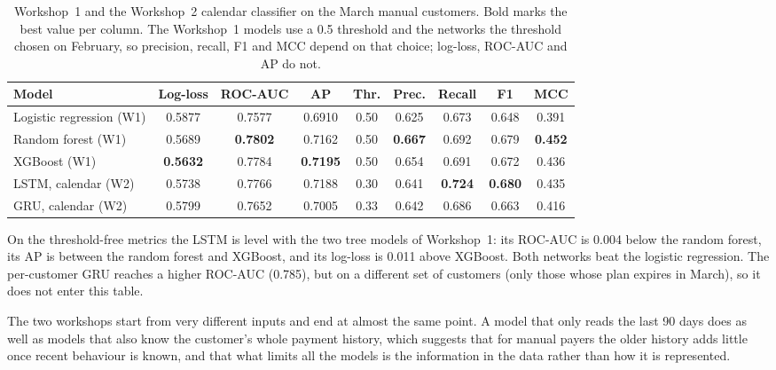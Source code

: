 \documentclass{article}
\begin{document}
\begin{table}[H]
\centering
\small
\setlength{\tabcolsep}{4pt}
\renewcommand{\arraystretch}{1.25}
\begin{tabular}{|l|c|c|c|c|c|c|c|c|}
\hline
\textbf{Model} & \textbf{Log-loss} & \textbf{ROC-AUC} & \textbf{AP} & \textbf{Thr.} & \textbf{Prec.} & \textbf{Recall} & \textbf{F1} & \textbf{MCC} \\ \hline
Logistic regression (W1) & 0.5877 & 0.7577 & 0.6910 & 0.50 & 0.625 & 0.673 & 0.648 & 0.391 \\ \hline
Random forest (W1)       & 0.5689 & \textbf{0.7802} & 0.7162 & 0.50 & \textbf{0.667} & 0.692 & 0.679 & \textbf{0.452} \\ \hline
XGBoost (W1)             & \textbf{0.5632} & 0.7784 & \textbf{0.7195} & 0.50 & 0.654 & 0.691 & 0.672 & 0.436 \\ \hline
LSTM, calendar (W2)      & 0.5738 & 0.7766 & 0.7188 & 0.30 & 0.641 & \textbf{0.724} & \textbf{0.680} & 0.435 \\ \hline
GRU, calendar (W2)       & 0.5799 & 0.7652 & 0.7005 & 0.33 & 0.642 & 0.686 & 0.663 & 0.416 \\ \hline
\end{tabular}
\caption{Workshop~1 and the Workshop~2 calendar classifier on the March manual customers. Bold marks the best value per column. The Workshop~1 models use a 0.5 threshold and the networks the threshold chosen on February, so precision, recall, F1 and MCC depend on that choice; log-loss, ROC-AUC and AP do not.}
\label{tab:w2_vs_w1}
\end{table}

On the threshold-free metrics the LSTM is level with the two tree models of Workshop~1: its ROC-AUC is 0.004 below the random forest, its AP is between the random forest and XGBoost, and its log-loss is 0.011 above XGBoost. Both networks beat the logistic regression. The per-customer GRU reaches a higher ROC-AUC (0.785), but on a different set of customers (only those whose plan expires in March), so it does not enter this table.

The two workshops start from very different inputs and end at almost the same point. A model that only reads the last 90 days does as well as models that also know the customer's whole payment history, which suggests that for manual payers the older history adds little once recent behaviour is known, and that what limits all the models is the information in the data rather than how it is represented.
\end{document}
